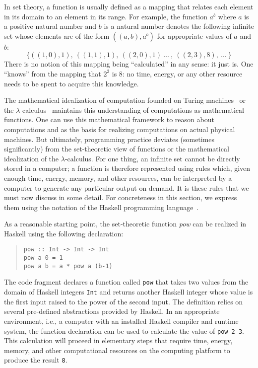 In set theory, a function is usually defined as a mapping that relates
each element in its domain to an element in its range. For example,
the function $a^b$ where $a$ is a positive natural number and $b$ is a
natural number denotes the following infinite set whose elements are
of the form $((a,b),a^b)$ for appropriate values of $a$ and $b$:
\[
\{ ((1,0),1), ~((1,1),1),~((2,0),1) ~\ldots~,~((2,3),8),~\ldots~ \}
\]
There is no notion of this mapping being ``calculated'' in any sense:
it just is. One ``knows'' from the mapping that $2^3$ is $8$: no time,
energy, or any other resource needs to be spent to acquire this
knowledge.

The mathematical idealization of computation founded on Turing
machines~\cite{citeulike:321509} or the
$\lambda$-calculus~\cite{Barendregt:Lambda} maintains this
understanding of computations as mathematical functions. One can use
this mathematical framework to reason about computations and as the
basis for realizing computations on actual physical machines. But
ultimately, programming practice deviates (sometimes significantly)
from the set-theoretic view of functions or the mathematical
idealization of the $\lambda$-calculus. For one thing, an infinite set
cannot be directly stored in a computer; a function is therefore
represented using rules which, given enough time, energy, memory, and
other resources, can be interpreted by a computer to generate any
particular output on demand. It is these rules that we must now
discuss in some detail. For concreteness in this section, we express
them using the notation of the Haskell programming
language~\cite{peytonjones:h98}.

As a reasonable starting point, the set-theoretic function \textit{pow}
can be realized in Haskell using the following declaration:
\begin{quote}
\begin{verbatim} 
pow :: Int -> Int -> Int
pow a 0 = 1
pow a b = a * pow a (b-1)
\end{verbatim}
\end{quote}
The code fragment declares a function called \verb|pow| that takes two values from the domain of Haskell integers \verb.Int. and returns another Haskell integer whose value is the first input raised to the power of the second input. The definition relies on several pre-defined abstractions provided by Haskell. In an appropriate environment, i.e., a computer with an installed Haskell compiler and runtime system, the function declaration can be used to calculate the value of \verb|pow 2 3|. This calculation will proceed in elementary steps that require time, energy, memory, and other computational resources on the computing platform to produce the result \verb|8|.


